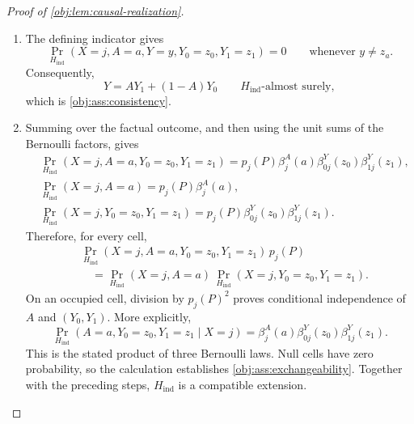 \begin{proof}[Proof of \cref{obj:lem:causal-realization}]
\begin{enumerate}
The propensity weights reconstruct the treatment--covariate masses:
\[
p_j(P)\beta^A_j(a)=s_{aj}(P).
\]
For \(p_j(P)=0\), nonnegativity and
\(s_{0j}(P)+s_{1j}(P)=0\) give both arm masses zero. For
\(p_j(P)>0\), the two identities are
\[
p_j(P)e_j(P)=s_{1j}(P),\qquad
p_j(P)\{1-e_j(P)\}=p_j(P)-s_{1j}(P)=s_{0j}(P).
\]
Likewise,
\[
s_{aj}(P)\beta^Y_{aj}(y)=P(X=j,A=a,Y=y).
\]
If \(s_{aj}(P)=0\), both observed outcome atoms vanish. If
\(s_{aj}(P)>0\), the identities for success and failure are
\begingroup\small
\[
s_{aj}(P)\mu_{aj}(P)=q_{aj}(P),\qquad
s_{aj}(P)\{1-\mu_{aj}(P)\}
=s_{aj}(P)-q_{aj}(P)
=P(X=j,A=a,Y=0).
\]
\endgroup
Combining these calculations proves
\[
\Pr_{H_{\mathrm{ind}}}(X=j,A=a,Y=y)
=P(X=j,A=a,Y=y).
\]
Equality at every atom proves equality of the observed marginal with
\(P\), and in particular
\[
\Pr_{H_{\mathrm{ind}}}(X=j)=p_j(P).
\]

\item
The defining indicator gives
\[
\Pr_{H_{\mathrm{ind}}}
 (X=j,A=a,Y=y,Y_0=z_0,Y_1=z_1)=0
\qquad\text{whenever }y\ne z_a.
\]
Consequently,
\[
Y=AY_1+(1-A)Y_0
\qquad H_{\mathrm{ind}}\text{-almost surely},
\]
which is \cref{obj:ass:consistency}.

\item
Summing over the factual outcome, and then using the unit sums of the
Bernoulli factors, gives
\[
\begin{aligned}
&\Pr_{H_{\mathrm{ind}}}(X=j,A=a,Y_0=z_0,Y_1=z_1)
=p_j(P)\beta^A_j(a)\beta^Y_{0j}(z_0)\beta^Y_{1j}(z_1),\\
&\Pr_{H_{\mathrm{ind}}}(X=j,A=a)=p_j(P)\beta^A_j(a),\\
&\Pr_{H_{\mathrm{ind}}}(X=j,Y_0=z_0,Y_1=z_1)
=p_j(P)\beta^Y_{0j}(z_0)\beta^Y_{1j}(z_1).
\end{aligned}
\]
Therefore, for every cell,
\[
\begin{aligned}
&\Pr_{H_{\mathrm{ind}}}(X=j,A=a,Y_0=z_0,Y_1=z_1)\,p_j(P)\\
&\quad=
\Pr_{H_{\mathrm{ind}}}(X=j,A=a)\,
\Pr_{H_{\mathrm{ind}}}(X=j,Y_0=z_0,Y_1=z_1).
\end{aligned}
\]
On an occupied cell, division by \(p_j(P)^2\) proves conditional
independence of \(A\) and \((Y_0,Y_1)\). More explicitly,
\[
\Pr_{H_{\mathrm{ind}}}
 (A=a,Y_0=z_0,Y_1=z_1\mid X=j)
=\beta^A_j(a)\beta^Y_{0j}(z_0)\beta^Y_{1j}(z_1).
\]
This is the stated product of three Bernoulli laws. Null cells have
zero probability, so the calculation establishes
\cref{obj:ass:exchangeability}. Together with the preceding steps,
\(H_{\mathrm{ind}}\) is a compatible extension.


\end{enumerate}
\end{proof}
